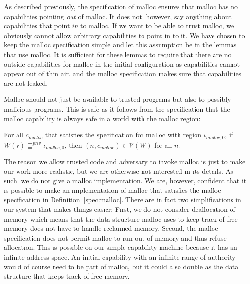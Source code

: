 \documentclass[format=acmsmall, review=true, screen=true]{acmart}
\newcommand{\var}[1]{\mathit{#1}}
\newcommand{\futurestr}{\mathbin{\sqsupseteq}^{\var{priv}}}
\newcommand{\codelabel}[1]{\mathit{#1}}
\newcommand{\malloc}{\codelabel{malloc}}
\newcommand{\asmType}{\plaindom{AsmType}}
\newcommand{\plaindom}[1]{\mathrm{#1}}
\newcommand{\intr}[2]{\mathcal{#1}}
\newcommand{\valueintr}[1]{\intr{V}{#1}}
\newcommand{\stdvr}{\valueintr{\asmType}}
\newcommand{\npair}[2][n]{\left(#1,#2 \right)}
\newenvironment{toplas}%
    {\color{OliveGreen}}{}
\newcommand{\itoplassug}[1]{}
\begin{document}
\begin{toplas}
As described previously, the specification of malloc ensures that malloc has no
capabilities pointing \textit{out} of malloc. It does not, however, say anything
about capabilities that point \textit{in} to malloc. If we want to be able to
trust malloc, we obviously cannot allow arbitrary capabilities to point in to
it. We have chosen to keep the malloc specification simple and let this
assumption be in the lemmas that use malloc. It is sufficient for these lemmas
to require that there are no outside capabilities for malloc in the initial
configuration as capabilities cannot appear out of thin air, and the malloc
specification makes sure that capabilities are not leaked.

Malloc should not just be available to trusted programs but also to possibly
malicious programs. This is safe as it follows from the specification that the malloc
capability is always safe in a world with the malloc region:
\begin{lemma}
  \label{lem:malloc-in-vr}
  For all $c_\malloc$ that satisfies the specification for malloc with region $\iota_{\malloc,0}$,  if $W(r) \futurestr \iota_{\malloc,0}$, then
  $\npair{c_\malloc} \in \stdvr(W)$ for all $n$.
\end{lemma}

The reason we allow trusted code and adversary to invoke malloc is just to make
our work more realistic, but we are otherwise not interested in its details. As
such, we do not give a malloc implementation. We are, however, confident that it
is possible to make an implementation of malloc that satisfies the malloc
specification in Definition~\ref{spec:malloc}. There are in fact two
simplifications in our system that makes things easier: First, we do not consider
deallocation of memory which means that the data structure malloc uses to keep
track of free memory does not have to handle reclaimed memory. Second, the
malloc specification does not permit malloc to run out of memory and thus refuse
allocation. This is possible on our simple capability machine because it has an
infinite address space. An initial capability with an infinite range of
authority would of course need to be part of malloc, but it could also double as
the data structure that keeps track of free memory. %


\end{toplas}
\end{document}
